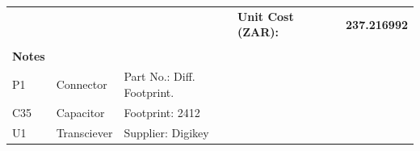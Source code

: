 \begin{landscape}
\begin{table}[]
\begin{tabular}{llllllll}
               &               &                            &                                 & \textbf{Unit Cost (ZAR):}            &                      &                 & \textbf{237.216992}  \\
               &               &                            &                                 &                                      &                      &                 &                      \\
\textbf{Notes} &               &                            &                                 &                                      &                      &                 &                      \\
P1             & Connector     & Part No.: Diff. Footprint. &                                 &                                      &                      &                 &                      \\
C35            & Capacitor     & Footprint: 2412            &                                 &                                      &                      &                 &                      \\
U1             & Transciever   & Supplier: Digikey          &                                 &                                      &                      &                 &                     
\end{tabular}
\end{table}
\end{landscape}





